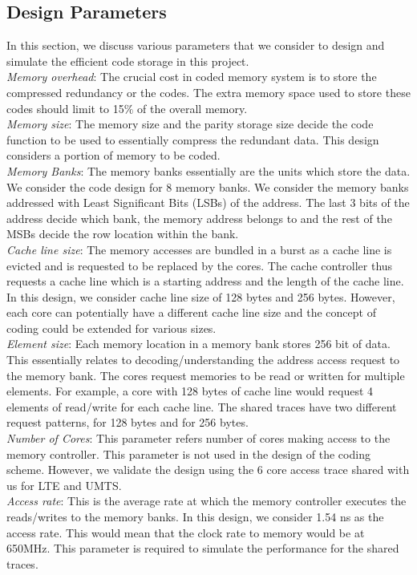 \subsection{Design Parameters}
In this section, we discuss various parameters that we consider 
to design and simulate the efficient code storage in this project. \\
\textit{Memory overhead}: 
The crucial cost in coded memory system is to store the compressed redundancy or 
the codes. The extra memory space used to store these codes should limit to 
15$\%$ of the overall memory.\\
\textit{Memory size}: The memory size and the parity storage size decide the 
code function to be used to essentially compress the redundant data. This design 
considers a portion of memory to be coded. \\ \textit{Memory Banks}: The memory 
banks essentially are the units which store the data. We consider the code 
design for 8 memory banks. We consider the memory banks addressed with Least 
Significant Bits (LSBs) of the address. The last 3 bits of the address decide 
which bank, the memory address belongs to and the rest of the MSBs decide the 
row location within the bank.\\ \textit{Cache line size}: The memory accesses 
are bundled in a burst as a cache line is evicted and is requested to be 
replaced by the cores. The cache controller thus requests a cache line which is 
a starting address and the length of the cache line. In this design, we consider 
cache line size of 128 bytes and 256 bytes. However, each core can potentially 
have a different cache line size and the concept of coding could be extended for 
various sizes.\\ \textit{Element size}:  Each memory location in a memory bank 
stores 256 bit of data. This essentially relates to decoding/understanding the 
address access request to the memory bank. The cores request memories to be read 
or written for multiple elements. For example, a core with 128 bytes of cache 
line would request 4 elements of read/write for each cache line. The shared 
traces have two different request patterns, for 128 bytes and for 256 bytes. \\
\textit{Number of Cores}: This parameter refers number of cores making access to 
the memory controller. This parameter is not used in the design of the coding 
scheme. However, we validate the design using the 6 core access trace shared 
with us for LTE and UMTS. \\
\textit{Access rate}: This is the average rate at which the memory controller 
executes the reads/writes to the memory banks. In this design, we consider 1.54 
ns as the access rate. This would mean that the clock rate to memory would be at 
650MHz. This parameter is required to simulate the performance for the shared 
traces.  

